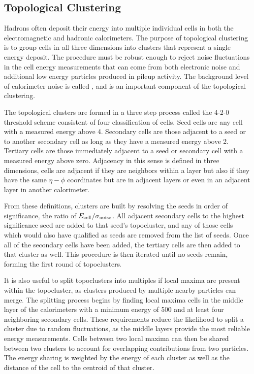 \subsection{Topological Clustering}

Hadrons often deposit their energy into multiple individual cells in both the electromagnetic and hadronic calorimeters.
The purpose of topological clustering is to group cells in all three dimensions into clusters that represent a single energy deposit.
The procedure must be robust enough to reject noise fluctuations in the cell energy measurements that can come from both electronic noise and additional low energy particles produced in pileup activity.
The background level of calorimeter noise is called \signoise, and is an important component of the topological clustering.

The topological clusters are formed in a three step process called the 4-2-0 threshold scheme consistent of four classification of cells.
Seed cells are any cell with a measured energy above 4\signoise.
Secondary cells are those adjacent to a seed or to another secondary cell as long as they have a measured energy above 2\signoise.
Tertiary cells are those immediately adjacent to a seed or secondary cell with a measured energy above zero.
Adjacency in this sense is defined in three dimensions, cells are adjacent if they are neighbors within a layer but also if they have the same $\eta-\phi$ coordinates but are in adjacent layers or even in an adjacent layer in another calorimeter.

From these definitions, clusters are built by resolving the seeds in order of significance, the ratio of $E_{\mathrm{cell}}/\sigma_{\mathrm{noise}}$.
All adjacent secondary cells to the highest significance seed are added to that seed's topocluster, and any of those cells which would also have qualified as seeds are removed from the list of seeds.
Once all of the secondary cells have been added, the tertiary cells are then added to that cluster as well.
This procedure is then iterated until no seeds remain, forming the first round of topoclusters.

It is also useful to split topoclusters into multiples if local maxima are present within the topocluster, as clusters produced by multiple nearby particles can merge.
The splitting process begins by finding local maxima cells in the middle layer of the calorimeters with a minimum energy of 500 \MeV and at least four neighboring secondary cells.
These requirements reduce the likelihood to split a cluster due to random fluctuations, as the middle layers provide the most reliable energy measurements.
Cells between two local maxima can then be shared between two clusters to account for overlapping contributions from two particles. The energy sharing is weighted by the energy of each cluster as well as the distance of the cell to the centroid of that cluster.

